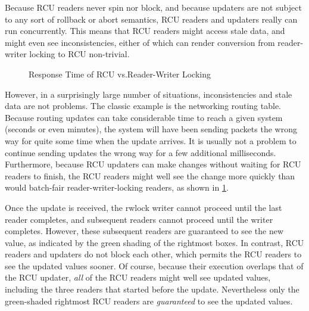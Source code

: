 Because RCU readers never spin nor block, and because updaters are not
subject to any sort of rollback or abort semantics, RCU readers and
updaters really can run concurrently.
This means that RCU readers might access stale data, and might even
see inconsistencies, either of which can render conversion from reader-writer
locking to RCU non-trivial.

\begin{figure}
\centering
{}
\caption{Response Time of RCU vs.\@ Reader-Writer Locking}
\label{fig:defer:Response Time of RCU vs. Reader-Writer Locking}
\end{figure}

However, in a surprisingly large number of situations, inconsistencies and
stale data are not problems.
The classic example is the networking routing table.
Because routing updates can take considerable time to reach a given
system (seconds or even minutes), the system will have been sending
packets the wrong way for quite some time when the update arrives.
It is usually not a problem to continue sending updates the wrong
way for a few additional milliseconds.
Furthermore, because RCU updaters can make changes without waiting for
RCU readers to finish,
the RCU readers might well see the change more quickly than would
batch-fair
reader-writer-locking readers, as shown in
\cref{fig:defer:Response Time of RCU vs. Reader-Writer Locking}.

\QuickQuizEnd

Once the update is received, the rwlock writer cannot proceed until the
last reader completes, and subsequent readers cannot proceed until the
writer completes.
However, these subsequent readers are guaranteed to see the new value,
as indicated by the green shading of the rightmost boxes.
In contrast, RCU readers and updaters do not block each other, which permits
the RCU readers to see the updated values sooner.
Of course, because their execution overlaps that of the RCU updater,
\emph{all} of the RCU readers might well see updated values, including
the three readers that started before the update.
Nevertheless only the green-shaded rightmost RCU readers
are \emph{guaranteed} to see the updated values.

